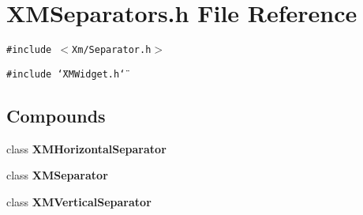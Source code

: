 \section{XMSeparators.h File Reference}
\label{XMSeparators_8h}
{\tt \#include $<$Xm/Separator.h$>$}\par
{\tt \#include \char`\"{}XMWidget.h\char`\"{}}\par
\subsection*{Compounds}
\begin{CompactItemize}
\item 
class {\bf XMHorizontal\-Separator}
\item 
class {\bf XMSeparator}
\item 
class {\bf XMVertical\-Separator}
\end{CompactItemize}
